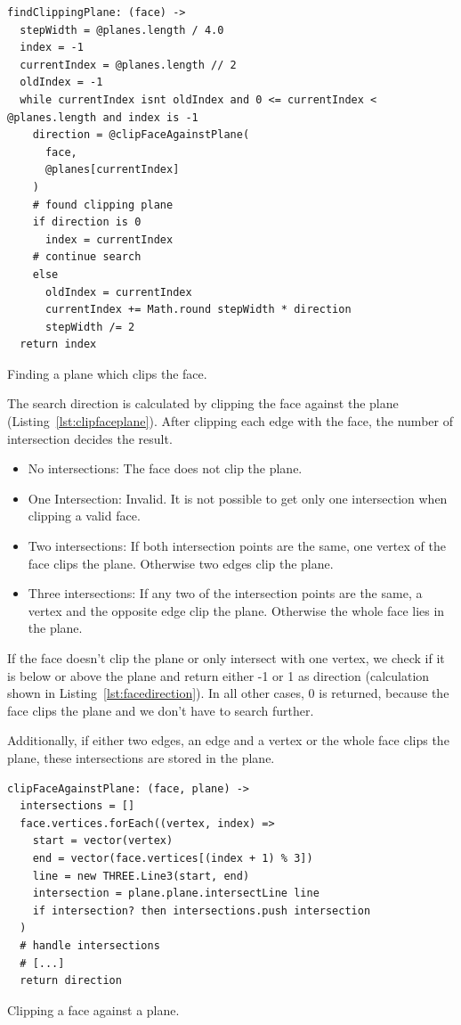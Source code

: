 \documentclass[../ClassicThesis.tex]{subfiles}
\begin{document}
\begin{listing}
\begin{verbatim}
findClippingPlane: (face) ->
  stepWidth = @planes.length / 4.0
  index = -1
  currentIndex = @planes.length // 2
  oldIndex = -1
  while currentIndex isnt oldIndex and 0 <= currentIndex < @planes.length and index is -1
    direction = @clipFaceAgainstPlane(
      face, 
      @planes[currentIndex]
    )
    # found clipping plane
    if direction is 0
      index = currentIndex
    # continue search
    else
      oldIndex = currentIndex
      currentIndex += Math.round stepWidth * direction
      stepWidth /= 2
  return index
\end{verbatim}
\caption{Finding a plane which clips the face.}
\label{lst:findplane}
\end{listing}

The search direction is calculated by clipping the face against the plane (Listing~\ref{lst:clipfaceplane}). After clipping each edge with the face, the number of intersection decides the result.

\begin{itemize}
  \item No intersections: The face does not clip the plane.
  \item One Intersection: Invalid. It is not possible to get only one intersection when clipping a valid face.
  \item Two intersections: If both intersection points are the same, one vertex of the face clips the plane. Otherwise two edges clip the plane.
  \item Three intersections: If any two of the intersection points are the same, a vertex and the opposite edge clip the plane. Otherwise the whole face lies in the plane.
\end{itemize}

If the face doesn't clip the plane or only intersect with one vertex, we check if it is below or above the plane and return either -1 or 1 as direction (calculation shown in Listing~\ref{lst:facedirection}). In all other cases, 0 is returned, because the face clips the plane and we don't have to search further. 

Additionally, if either two edges, an edge and a vertex or the whole face clips the plane, these intersections are stored in the plane.

\begin{listing}
\begin{verbatim}
clipFaceAgainstPlane: (face, plane) ->
  intersections = []
  face.vertices.forEach((vertex, index) =>
    start = vector(vertex)
    end = vector(face.vertices[(index + 1) % 3])
    line = new THREE.Line3(start, end)
    intersection = plane.plane.intersectLine line
    if intersection? then intersections.push intersection
  )
  # handle intersections
  # [...]
  return direction
\end{verbatim}
\caption{Clipping a face against a plane.}
\label{lst:clipfaceplane}
\end{listing}
\end{document}
